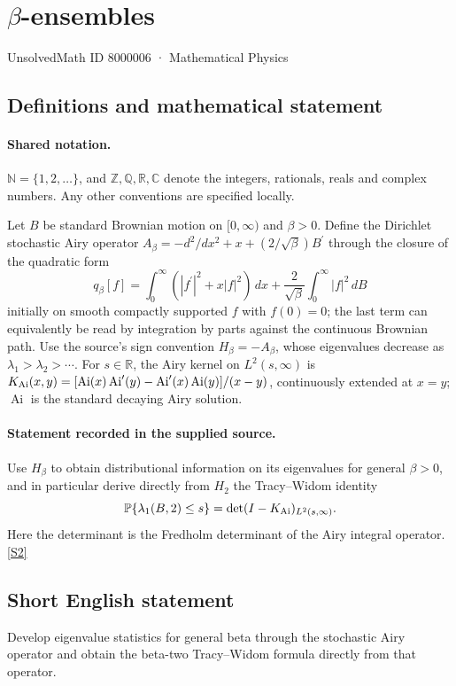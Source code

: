 \documentclass[11pt]{article}
\newcommand{\sref}[2]{\hyperlink{source:#1:#2}{[S#2]}}
\begin{document}
\setcounter{section}{8000005}
\section{\texorpdfstring{$\beta$}{beta}-ensembles}\label{8000006}
{\small\sffamily UnsolvedMath ID 8000006 · Mathematical Physics}
\subsection{Definitions and mathematical statement}

\paragraph{Shared notation.}$\mathbb N=\{1,2,\ldots\}$, and $\mathbb Z,\mathbb Q,\mathbb R,\mathbb C$ denote the integers, rationals, reals and complex numbers. Any other conventions are specified locally.


Let $B$ be standard Brownian motion on $[0,\infty)$ and $\beta>0$. Define the Dirichlet stochastic Airy operator $A_\beta=-d^2/dx^2+x+(2/\sqrt\beta)B^{\prime}$ through the closure of the quadratic form \[q_\beta[f]=\int_0^\infty(|f^{\prime}|^2+x|f|^2)\,dx+\frac2{\sqrt\beta}\int_0^\infty|f|^2\,dB\] initially on smooth compactly supported $f$ with $f(0)=0$; the last term can equivalently be read by integration by parts against the continuous Brownian path. Use the source's sign convention $H_\beta=-A_\beta$, whose eigenvalues decrease as $\lambda_1>\lambda_2>\cdots$. For $s\in\mathbb R$, the Airy kernel on $L^2(s,\infty)$ is $K_{\rm Ai}(x,y)=[\operatorname{Ai}(x)\operatorname{Ai}^{\prime}(y)-\operatorname{Ai}^{\prime}(x)\operatorname{Ai}(y)]/(x-y)$, continuously extended at $x=y$; $\operatorname{Ai}$ is the standard decaying Airy solution.
\paragraph{Statement recorded in the supplied source.}
Use $H_\beta$ to obtain distributional information on its eigenvalues for general $\beta>0$, and in particular derive directly from $H_2$ the Tracy--Widom identity \[\mathbb P\{\lambda_1(B,2)\le s\}=\det(I-K_{\rm Ai})_{L^2(s,\infty)}.\] Here the determinant is the Fredholm determinant of the Airy integral operator. \sref{8000006}{2}
\subsection{Short English statement}
Develop eigenvalue statistics for general beta through the stochastic Airy operator and obtain the beta-two Tracy--Widom formula directly from that operator.
\end{document}
